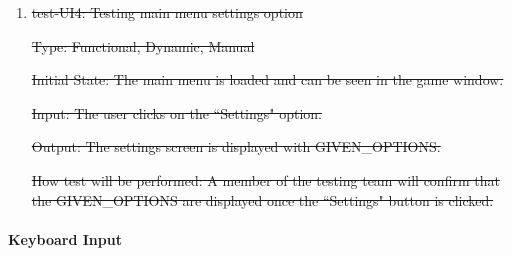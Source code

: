 \documentclass[12pt, titlepage]{article}
\begin{document}
\begin{enumerate}
\item{\sout{test-UI4: Testing main menu settings option}\\}

\sout{Type: Functional, Dynamic, Manual}
					
\sout{Initial State: The main menu is loaded and can be seen in the game window.}
					
\sout{Input: The user clicks on the ``Settings" option.}
					
\sout{Output: The settings screen is displayed with GIVEN\_OPTIONS.}
					
\sout{How test will be performed: A member of the testing team will confirm that the GIVEN\_OPTIONS are displayed once the ``Settings" button is clicked.}

\end{enumerate}		
\paragraph{Keyboard Input}
\end{document}
